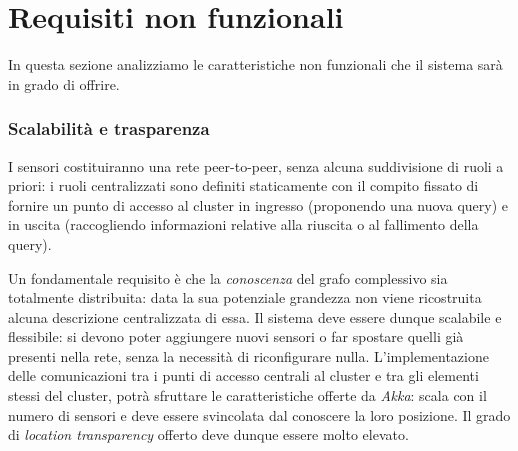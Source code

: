 \documentclass{llncs}
\begin{document}

\section{Requisiti non funzionali}
\label{sec:nonfunc-req}

In questa sezione analizziamo le caratteristiche non funzionali
che il sistema sarà in grado di offrire.

\subsubsection*{Scalabilità e trasparenza}
I sensori costituiranno una rete peer-to-peer,
senza alcuna suddivisione di ruoli a priori: i ruoli centralizzati
sono definiti staticamente con il compito fissato di fornire un punto
di accesso al cluster in ingresso (proponendo una nuova query) e
in uscita (raccogliendo informazioni relative alla riuscita
o al fallimento della query).

Un fondamentale requisito è che
la \emph{conoscenza} del grafo complessivo sia totalmente distribuita:
data la sua potenziale grandezza
non viene ricostruita alcuna descrizione centralizzata di essa.
Il sistema deve essere dunque scalabile e flessibile:
si devono poter aggiungere nuovi sensori o far spostare
quelli già presenti nella rete, senza la necessità di riconfigurare nulla.
L'implementazione delle
comunicazioni tra i punti di accesso centrali al cluster e
tra gli elementi stessi del cluster, potrà
sfruttare le caratteristiche offerte da \emph{Akka}:
scala con il numero di sensori e
deve essere svincolata dal conoscere la loro posizione.
Il grado di \emph{location transparency} offerto deve dunque essere molto elevato.
\end{document}
